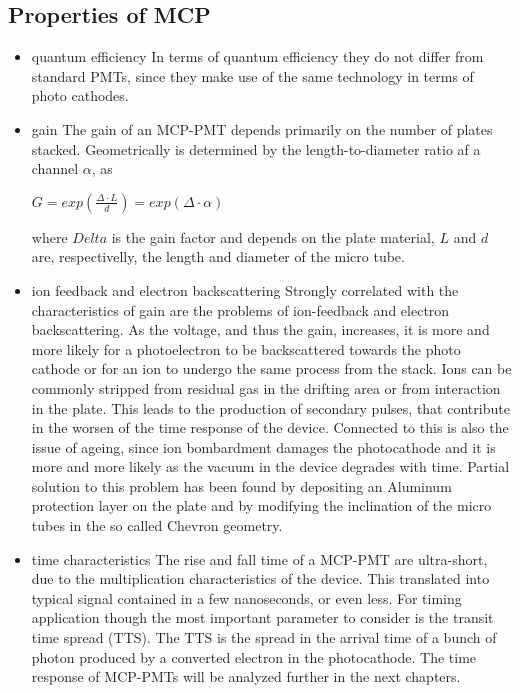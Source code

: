 \subsection{Properties of MCP}
\begin{itemize}
\item quantum efficiency
In terms of quantum efficiency they do not differ from standard PMTs, since they make use of the same technology in terms of photo cathodes.
\item gain
The gain of an MCP-PMT depends primarily on the number of plates stacked. Geometrically is determined by the length-to-diameter ratio af a channel $\alpha$, as

$G = exp(\frac{\Delta \cdot L}{d}) = exp(\Delta \cdot \alpha)$

where $Delta$ is the gain factor and depends on the plate material, $L$ and $d$ are, respectivelly, the length and diameter of the micro tube.
\item ion feedback and electron backscattering
Strongly correlated with the characteristics of gain are the problems of ion-feedback and electron backscattering. As the voltage, and thus the gain, increases, it is more and more likely for a photoelectron to be backscattered towards the photo cathode or for an ion to undergo the same process from the stack. Ions can be commonly stripped from residual gas in the drifting area or from interaction in the plate.
This leads to the production of secondary pulses, that contribute in the worsen of the time response of the device.
Connected to this is also the issue of ageing, since ion bombardment damages the photocathode and it is more and more likely as the vacuum in the device degrades with time.
Partial solution to this problem has been found by depositing an Aluminum protection layer on the plate and by modifying the inclination of the micro tubes in the so called Chevron geometry\cite{Vavra2004}.

\item time characteristics
The rise and fall time of a MCP-PMT are ultra-short, due to the multiplication characteristics of the device. This translated into typical signal contained in a few nanoseconds, or even less. For timing application though the most important parameter to consider is the transit time spread (TTS). The TTS is the spread in the arrival time of a bunch of photon produced by a converted electron in the photocathode. The time response of MCP-PMTs will be analyzed further in the next chapters.

\end{itemize}

